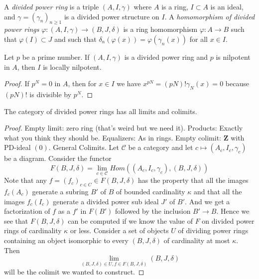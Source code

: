 \begin{definition}
\label{definition-divided-power-ring}
A {\it divided power ring} is a triple $(A, I, \gamma)$ where
$A$ is a ring, $I \subset A$ is an ideal, and $\gamma = (\gamma_n)_{n \geq 1}$
is a divided power structure on $I$.
A {\it homomorphism of divided power rings}
$\varphi : (A, I, \gamma) \to (B, J, \delta)$ is a ring homomorphism
$\varphi : A \to B$ such that $\varphi(I) \subset J$ and such that
$\delta_n(\varphi(x)) = \varphi(\gamma_n(x))$ for all $x \in I$.
\end{definition}

\begin{lemma}
\label{lemma-nil}
Let $p$ be a prime number.
If $(A, I, \gamma)$ is a divided power ring and $p$ is nilpotent
in $A$, then $I$ is locally nilpotent.
\end{lemma}

\begin{proof}
If $p^N = 0$ in $A$, then for $x \in I$ we have
$x^{pN} = (pN)!\gamma_N(x) = 0$ because $(pN)!$ is
divisible by $p^N$.
\end{proof}

\begin{lemma}
\label{lemma-colimits}
The category of divided power rings has all limits and colimits.
\end{lemma}

\begin{proof}
Empty limit: zero ring (that's weird but we need it).
Products: Exactly what you think they should be.
Equalizers: As in rings.
Empty colimit: $\mathbf{Z}$ with PD-ideal $(0)$.
General Colimits. Let $\mathcal{C}$ be a category and let
$c \mapsto (A_c, I_c, \gamma_c)$ be a diagram. Consider the functor
$$
F(B, J, \delta) = \lim_{c \in \mathcal{C}}
Hom((A_c, I_c, \gamma_c), (B, J, \delta))
$$
Note that any $f = (f_c)_{c \in C} \in F(B, J, \delta)$ has the property
that all the images $f_c(A_c)$ generate a subring $B'$ of $B$ of bounded
cardinality $\kappa$ and that all the images $f_c(I_c)$ generate a
divided power sub ideal $J'$ of $B'$. And we get a factorization of
$f$ as a $f'$ in $F(B')$ followed by the inclusion $B' \to B$.
Hence we see that $F(B, J, \delta)$ can be computed if we know the value
of $F$ on divided power rings of
cardinality $\kappa$ or less. Consider a set of objects $U$ of
dividing power rings containing an object isomorphic to every
$(B, J, \delta)$ of cardinality
at most $\kappa$. Then
$$
\lim_{(B, J, \delta) \in U, f \in F(B, J, \delta)} (B, J, \delta)
$$
will be the colimit we wanted to construct.
\end{proof}

